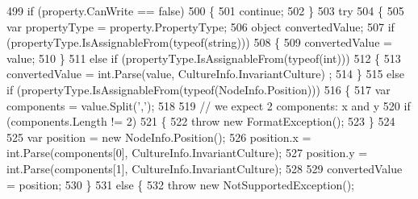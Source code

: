 \begin{DoxyCode}
499                                     \textcolor{keywordflow}{if} (property.CanWrite == \textcolor{keyword}{false})
500                                     \{
501                                         \textcolor{keywordflow}{continue};
502                                     \}
503                                     \textcolor{keywordflow}{try}
504                                     \{
505                                         var propertyType = property.PropertyType;
506                                         \textcolor{keywordtype}{object} convertedValue;
507                                         \textcolor{keywordflow}{if} (propertyType.IsAssignableFrom(typeof(\textcolor{keywordtype}{string})))
508                                         \{
509                                             convertedValue = value;
510                                         \}
511                                         \textcolor{keywordflow}{else} \textcolor{keywordflow}{if} (propertyType.IsAssignableFrom(typeof(\textcolor{keywordtype}{int})))
512                                         \{
513                                             convertedValue = int.Parse(value, CultureInfo.InvariantCulture)
      ;
514                                         \}
515                                         \textcolor{keywordflow}{else} \textcolor{keywordflow}{if} (propertyType.IsAssignableFrom(typeof(NodeInfo.Position)))
516                                         \{
517                                             var components = value.Split(\textcolor{charliteral}{','});
518 
519                                             \textcolor{comment}{// we expect 2 components: x and y}
520                                             \textcolor{keywordflow}{if} (components.Length != 2)
521                                             \{
522                                                 \textcolor{keywordflow}{throw} \textcolor{keyword}{new} FormatException();
523                                             \}
524 
525                                             var position = \textcolor{keyword}{new} NodeInfo.Position();
526                                             position.x = int.Parse(components[0], 
      CultureInfo.InvariantCulture);
527                                             position.y = int.Parse(components[1], 
      CultureInfo.InvariantCulture);
528 
529                                             convertedValue = position;
530                                         \}
531                                         \textcolor{keywordflow}{else} \{
532                                             \textcolor{keywordflow}{throw} \textcolor{keyword}{new} NotSupportedException();

\end{DoxyCode}
